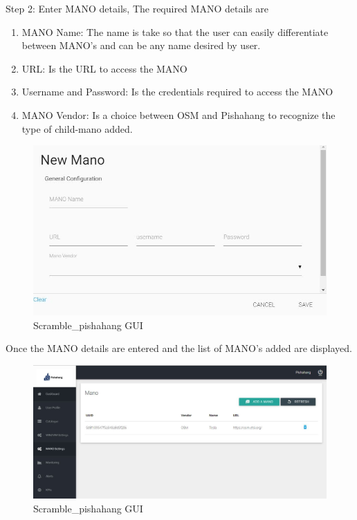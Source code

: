 Step 2: Enter MANO details, The required MANO details are 
\begin{enumerate}
	\item MANO Name: The name is take so that the user can easily differentiate between MANO's and can be any name desired by user.
	\item URL: Is the URL to access the MANO
	\item Username and Password: Is the credentials required to access the MANO
	\item MANO Vendor: Is a choice between OSM and Pishahang to recognize the type of child-mano added.   
\end{enumerate}
\begin{figure}[H]
	\centering
	\includegraphics[width=1\linewidth]{"figures/son-gui-step-2"}
	\caption{Scramble\_pishahang GUI}
	\label{fig:sequence-diagram-scramble}
\end{figure}

Once the MANO details are entered and the list of MANO's added are displayed.
\begin{figure}[H]
	\centering
	\includegraphics[width=1\linewidth]{"figures/son-gui-step-3"}
	\caption{Scramble\_pishahang GUI}
	\label{fig:sequence-diagram-scramble}
\end{figure}

